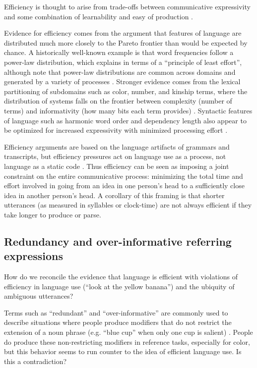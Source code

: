 \documentclass[]{article}
\begin{document}
Efficiency is thought to arise from trade-offs between communicative expressivity and some combination of learnability and easy of production \citep{piantadosi2012, kirby2015}.

Evidence for efficiency comes from the argument that features of language are distributed much more closely to the Pareto frontier than would be expected by chance. A historically well-known example is that word frequencies follow a power-law distribution, which \citet{zipf1949} explains in terms of a ``principle of least effort'', although note that power-law distributions are common across domains and generated by a variety of processes \citep{piantadosi2014}. Stronger evidence comes from the lexical partitioning of subdomains such as color, number, and kinship terms, where the distribution of systems falls on the frontier between complexity (number of terms) and informativity (how many bits each term provides) \citep{zaslavsky2018, kemp2018, gibson2019}. Syntactic features of language such as harmonic word order and dependency length also appear to be optimized for increased expressivity with minimized processing effort \citep{gibson2019, hawkins1995}. 
	
Efficiency arguments are based on the language artifacts of grammars and transcripts, but efficiency pressures act on language use as a process, not language as a static code \citep{gibson2019}. Thus efficiency can be seen as imposing a joint constraint on the entire communicative process: minimizing the total time and effort involved in going from an idea in one person's head to a sufficiently close idea in another person's head. A corollary of this framing is that shorter utterances (as measured in syllables or clock-time) are not always efficient if they take longer to produce or parse. 



\subsection{Redundancy and over-informative referring expressions}
How do we reconcile the evidence that language is efficient with violations of efficiency in language use (``look at the yellow banana'') and the ubiquity of ambiguous utterances?

Terms such as ``redundant'' and ``over-informative'' are commonly used to describe situations where people produce modifiers that do not restrict the extension of a noun phrase (e.g. ``blue cup'' when only one cup is salient) \citep{rubio-fernandez2021}. People do produce these non-restricting modifiers in reference tasks, especially for color, but this behavior seems to run counter to the idea of efficient language use. Is this a contradiction? 
\end{document}
